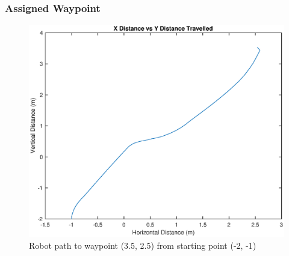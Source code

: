 \documentclass[11pt]{article}
\newcommand{\graphScale}{0.5}
\begin{document}
\subsubsection{Assigned Waypoint}
\begin{figure}[H]
    \centering
\includegraphics[scale=\graphScale]{./figures/ToWaypoint.eps}
\caption{Robot path to waypoint (3.5, 2.5) from starting point (-2, -1)}
\end{figure}
\end{document}
